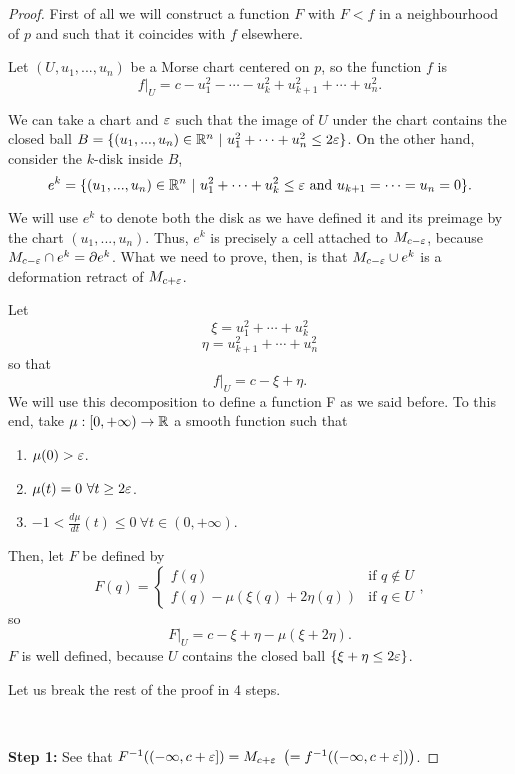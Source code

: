 \begin{proof}
First of all we will construct a function $F$ with $F < f$ in a neighbourhood of $p$ and such that it coincides with $f$ elsewhere.

Let $(U,u_1,...,u_n)$ be a Morse chart centered on $p$, so the function $f$ is
\[\left. f \right|_U = c - u_1^2 - \cdots - u_k^2 + u_{k+1}^2 + \cdots + u_n^2 .\]

We can take a chart and $\varepsilon$ such that the image of $U$ under the chart contains the closed ball $B = \{(u_1,...,u_n) \in \mathbb{R}^n \ | \ u_1^2 + \cdots + u_n^2 \leq 2\varepsilon\}$. On the other hand, consider the $k$-disk inside $B$,
\[e^k = \{ (u_1,...,u_n) \in \mathbb{R}^n \ | \ u_1^2 + \cdots + u_k^2 \leq \varepsilon \text{ and } u_{k+1} = \cdots = u_n = 0 \} .\]

We will use $e^k$ to denote both the disk as we have defined it and its preimage by the chart $(u_1,...,u_n)$. Thus, $e^k$ is precisely a cell attached to $M_{c-\varepsilon}$, because $M_{c-\varepsilon} \cap e^k = \partial e^k$. What we need to prove, then, is that $M_{c-\varepsilon} \cup e^k$ is a deformation retract of $M_{c+\varepsilon}$.

Let
\[\xi = u_1^2 + \cdots + u_k^2\]
\[\eta = u_{k+1}^2 + \cdots + u_n^2\]
so that
\[\left. f \right|_U = c - \xi + \eta .\]
We will use this decomposition to define a function F as we said before. To this end, take $\mu : [0,+\infty) \rightarrow \mathbb{R}$ a smooth function such that

\begin{enumerate}
	\item $\mu(0) > \varepsilon$.
	\item $\mu(t) = 0 \ \forall t \geq 2\varepsilon$.
	\item $-1 < \frac{d \mu}{d t}(t) \leq 0 \ \forall t \in (0,+\infty)$.
\end{enumerate}

Then, let $F$ be defined by
\[F(q) = \left\{ \begin{array}{ll} f(q) & \text{if } q \notin U \\ f(q) - \mu(\xi(q) + 2\eta(q)) & \text{if } q \in U \end{array} \right. ,\]
so
\[\left. F \right|_U = c - \xi + \eta - \mu(\xi + 2\eta) .\]
$F$ is well defined, because $U$ contains the closed ball $\{ \xi + \eta \leq 2\varepsilon \}$.

Let us break the rest of the proof in 4 steps.

\

{\bf Step 1:} See that $F^{-1}((-\infty,c+\varepsilon]) = M_{c+\varepsilon} \ \left( = f^{-1}((-\infty,c+\varepsilon]) \right)$.


\end{proof}
